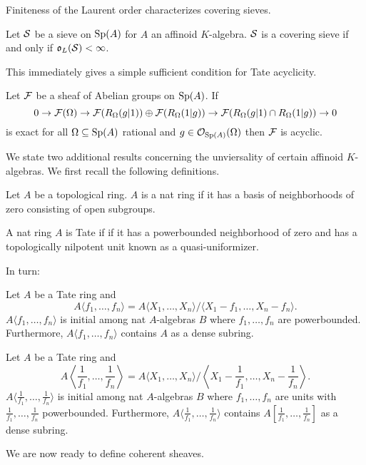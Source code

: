 Finiteness of the Laurent order characterizes covering sieves. 
\begin{proposition}\label{prop: finite Laurent order iff covering}
    Let $\mathcal{S}$ be a sieve on $\mathrm{Sp}(A)$ for $A$ an affinoid $K$-algebra. $\mathcal{S}$ is a covering sieve if and only if $\mathfrak{o}_{L}(\mathcal{S})<\infty$. 
\end{proposition}
This immediately gives a simple sufficient condition for Tate acyclicity. 
\begin{corollary}\label{def: two set condition for acyclicity}
    Let $\mathcal{F}$ be a sheaf of Abelian groups on $\mathrm{Sp}(A)$. If 
    $$0\to\mathcal{F}(\Omega)\to\mathcal{F}(R_{\Omega}(g|1))\oplus\mathcal{F}(R_{\Omega}(1|g))\to\mathcal{F}(R_{\Omega}(g|1)\cap R_{\Omega}(1|g))\to0$$
    is exact for all $\Omega\subseteq\mathrm{Sp}(A)$ rational and $g\in\mathcal{O}_{\mathrm{Sp}(A)}(\Omega)$ then $\mathcal{F}$ is acyclic. 
\end{corollary}
We state two additional results concerning the unviersality of certain affinoid $K$-algebras. We first recall the following definitions. 
\begin{definition}\label{def: nat ring}
    Let $A$ be a topological ring. $A$ is a nat ring if it has a basis of neighborhoods of zero consisting of open subgroups. 
\end{definition}
\begin{definition}\label{def: Tate ring}
    A nat ring $A$ is Tate if if it has a powerbounded neighborhood of zero and has a topologically nilpotent unit known as a quasi-uniformizer. 
\end{definition}
In turn:
\begin{proposition}\label{prop: universality of quotients}
    Let $A$ be a Tate ring and 
    $$A\langle f_{1},\dots,f_{n}\rangle=A\langle X_{1},\dots,X_{n}\rangle/\langle X_{1}-f_{1},\dots,X_{n}-f_{n}\rangle.$$
    $A\langle f_{1},\dots,f_{n}\rangle$ is initial among nat $A$-algebras $B$ where $f_{1},\dots,f_{n}$ are powerbounded. Furthermore, $A\langle f_{1},\dots,f_{n}\rangle$ contains $A$ as a dense subring. 
\end{proposition}
\begin{proposition}\label{prop: universality of localizations}
    Let $A$ be a Tate ring and 
    $$A\left\langle\frac{1}{f_{1}},\dots,\frac{1}{f_{n}}\right\rangle=A\langle X_{1},\dots,X_{n}\rangle/\left\langle X_{1}-\frac{1}{f_{1}},\dots,X_{n}-\frac{1}{f_{n}}\right\rangle.$$
    $A\langle\frac{1}{f_{1}},\dots,\frac{1}{f_{n}}\rangle$ is initial among nat $A$-algebras $B$ where $f_{1},\dots,f_{n}$ are units with $\frac{1}{f_{1}},\dots,\frac{1}{f_{n}}$ powerbounded. Furthermore, $A\langle\frac{1}{f_{1}},\dots,\frac{1}{f_{n}}\rangle$ contains $A[\frac{1}{f_{1}},\dots,\frac{1}{f_{n}}]$ as a dense subring. 
\end{proposition}
We are now ready to define coherent sheaves. 

